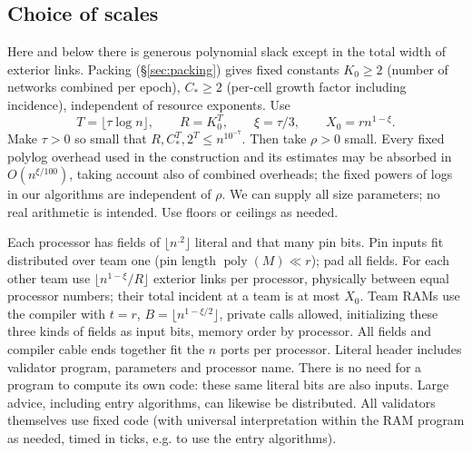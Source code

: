 \documentclass[11pt,letterpaper]{article}
\theoremstyle{definition}
\numberwithin{equation}{section}
\DeclareMathOperator{\poly}{poly}
\begin{document}
\subsection{Choice of scales}

Here and below there is generous polynomial slack except in the total width of exterior
links. Packing (\S\ref{sec:packing}) gives fixed constants $K_0 \ge 2$ (number of networks combined per epoch),
$C_\ast \ge 2$ (per-cell growth factor including incidence), independent of resource exponents. Use
\[
  T=\lfloor\tau\log n\rfloor,\qquad R=K_0^T,\qquad \xi=\tau/3,\qquad X_0=rn^{1-\xi}.
\]
Make $\tau >0$ so small that $R,C_\ast^T,2^T\le n^{10^{-7}}$. Then take $\rho >0$ small. Every fixed polylog
overhead used in the construction and its estimates may be absorbed in $O(n^{\xi/100})$, taking
account also of combined overheads; the fixed powers of logs in our algorithms are independent
of $\rho$. We can supply all size parameters; no real arithmetic is intended. Use floors or ceilings
as needed.

Each processor has fields of $\lfloor n^{.2}\rfloor$ literal and that many pin bits. Pin inputs fit distributed
over team one (pin length $\poly(M)\ll r$); pad all fields. For each other team use $\lfloor n^{1-\xi}/R\rfloor$
exterior links per processor, physically between equal processor numbers; their total incident
at a team is at most $X_0$. Team RAMs use the compiler with $t=r$, $B=\lfloor n^{1-\xi/2}\rfloor$, private
calls allowed, initializing these three kinds of fields as input bits, memory order by processor.
All fields and compiler cable ends together fit the $n$ ports per processor. Literal header
includes validator program, parameters and processor name. There is no need for a program
to compute its own code: these same literal bits are also inputs. Large advice, including
entry algorithms, can likewise be distributed. All validators themselves use fixed code (with
universal interpretation within the RAM program as needed, timed in ticks, e.g. to use the
entry algorithms).
\end{document}
